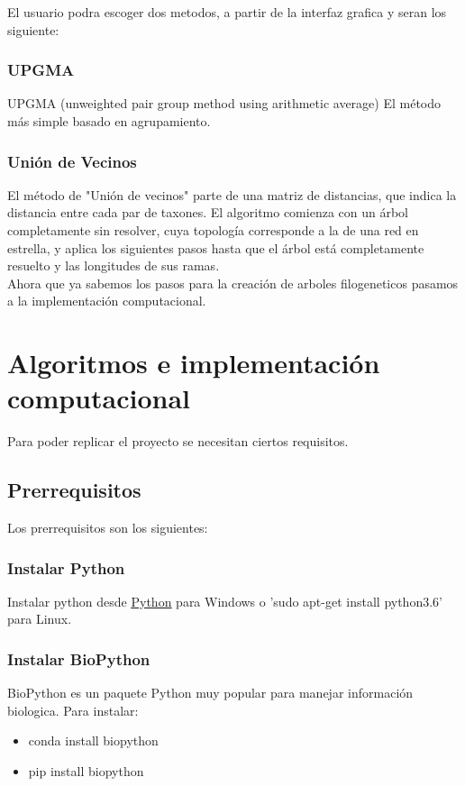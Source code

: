 \documentclass[a4paper]{article}
\begin{document}
\noindent El usuario podra escoger dos metodos, a partir de la interfaz grafica y seran los siguiente:
\subsubsection{UPGMA}
UPGMA (unweighted pair group method using arithmetic average)
El método más simple basado en agrupamiento.

\subsubsection{Unión de Vecinos}
El método de "Unión de vecinos" parte de una matriz de distancias, que indica la distancia entre cada par de taxones. El algoritmo comienza con un árbol completamente sin resolver, cuya topología corresponde a la de una red en estrella, y aplica los siguientes pasos hasta que el árbol está completamente resuelto y las longitudes de sus ramas.\\

\noindent Ahora que ya sabemos los pasos para la creación de arboles filogeneticos pasamos a la implementación computacional.


\section{Algoritmos e implementación computacional}
Para poder replicar el proyecto se necesitan ciertos requisitos.
\subsection{Prerrequisitos}

Los prerrequisitos son los siguientes:
\subsubsection*{Instalar Python}
Instalar python desde \href{https://www.python.org/downloads/}{\underline{Python}} para Windows o 'sudo apt-get install python3.6' para Linux.
\subsubsection*{Instalar BioPython}
BioPython es un paquete Python muy popular para manejar información biologica.
Para instalar:
\begin{itemize}
	\item conda install biopython
	\item pip install biopython
\end{itemize}
\end{document}
